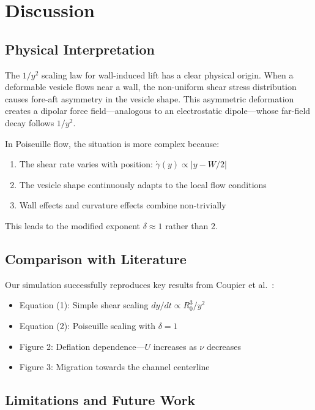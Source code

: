 \documentclass{article}
\begin{document}
\section{Discussion}

\subsection{Physical Interpretation}

The $1/y^2$ scaling law for wall-induced lift has a clear physical origin. When a deformable vesicle flows near a wall, the non-uniform shear stress distribution causes fore-aft asymmetry in the vesicle shape. This asymmetric deformation creates a dipolar force field---analogous to an electrostatic dipole---whose far-field decay follows $1/y^2$.

In Poiseuille flow, the situation is more complex because:
\begin{enumerate}
    \item The shear rate varies with position: $\dot{\gamma}(y) \propto |y - W/2|$
    \item The vesicle shape continuously adapts to the local flow conditions
    \item Wall effects and curvature effects combine non-trivially
\end{enumerate}
This leads to the modified exponent $\delta \approx 1$ rather than 2.

\subsection{Comparison with Literature}

Our simulation successfully reproduces key results from Coupier et al.~\cite{coupier2009}:
\begin{itemize}
    \item[\checkmark] Equation (1): Simple shear scaling $dy/dt \propto R_0^3/y^2$
    \item[\checkmark] Equation (2): Poiseuille scaling with $\delta = 1$
    \item[\checkmark] Figure 2: Deflation dependence---$U$ increases as $\nu$ decreases
    \item[\checkmark] Figure 3: Migration towards the channel centerline
\end{itemize}

\subsection{Limitations and Future Work}
\end{document}

